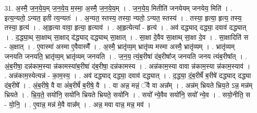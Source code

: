 \documentclass[17pt]{extarticle}
\begin{document}
31. अ॒स्मै॒ ज॒न॒ये॒य॒म् ज॒न॒ये॒य॒ म॒स्मा॒ अ॒स्मै॒ ज॒न॒ये॒य॒म् । . ज॒न॒ये॒य॒ मितीति॑ जनयेयम् जनयेय॒ मिति॑ । . इत्य॒न्यतो॒ ऽन्यत॒ इती त्य॒न्यतः॑ । . अ॒न्यत॒ स्तस्य॒ तस्या॒ न्यतो॒ ऽन्यत॒ स्तस्य॑ । . तस्या॒ हृत्या॒ हृत्य॒ तस्य॒ तस्या॒ हृत्य॑ । . आ॒हृत्या वावा॒ हृत्या॒ हृत्याव॑ । . आ॒हृत्येत्या᳚ - हृत्य॑ । . अव॑ दद्ध्याद् दद्ध्या॒ दवाव॑ दद्ध्यात् । . द॒द्ध्या॒थ् सा॒क्षाथ् सा॒क्षाद् द॑द्ध्याद् दद्ध्याथ् सा॒क्षात् । . सा॒क्षा दे॒वैव सा॒क्षाथ् सा॒क्षा दे॒व । . सा॒क्षादिति॑ स - अ॒क्षात् । . ए॒वास्मा॑ अस्मा ए॒वैवास्मै᳚ । . अ॒स्मै॒ भ्रातृ॑व्य॒म् भ्रातृ॑व्य मस्मा अस्मै॒ भ्रातृ॑व्यम् । . भ्रातृ॑व्यम् जनयति जनयति॒ भ्रातृ॑व्य॒म् भ्रातृ॑व्यम् जनयति । . ज॒न॒य॒ त्यं॒ब॒रीषा॑ दंब॒रीषा᳚ज् जनयति जनय त्यंब॒रीषा᳚त् । . अं॒ब॒रीषा॒ दन्न॑काम॒स्या न्न॑कामस्यांब॒रीषा॑ दंब॒रीषा॒ दन्न॑कामस्य । . अन्न॑काम॒स्या वावा न्न॑काम॒स्या न्न॑काम॒स्याव॑ । . अन्न॑काम॒स्येत्यन्न॑ - का॒म॒स्य॒ । . अव॑ दद्ध्याद् दद्ध्या॒ दवाव॑ दद्ध्यात् । . द॒द्ध्या॒ दं॒ब॒रीषें᳚ ब॒रीषे॑ दद्ध्याद् दद्ध्या दंब॒रीषे᳚ । . अं॒ब॒रीषे॒ वै वा अं॑ब॒रीषें᳚ ब॒रीषे॒ वै । . वा अन्न॒ मन्नं॒ ॅवै वा अन्न᳚म् । . अन्न॑म् भ्रियते भ्रिय॒ते ऽन्न॒ मन्न॑म् भ्रियते । . भ्रि॒य॒ते॒ सयो॑नि॒ सयो॑नि भ्रियते भ्रियते॒ सयो॑नि । . सयो᳚ न्ये॒वैव सयो॑नि॒ सयो᳚ न्ये॒व । . सयो॒नीति॒ स - यो॒नि॒ । . ए॒वान्न॒ मन्न॑ मे॒वै वान्न᳚म् । . अन्न॒ मवा वान्न॒ मन्न॒ मव॑ । \newline
\end{document}
